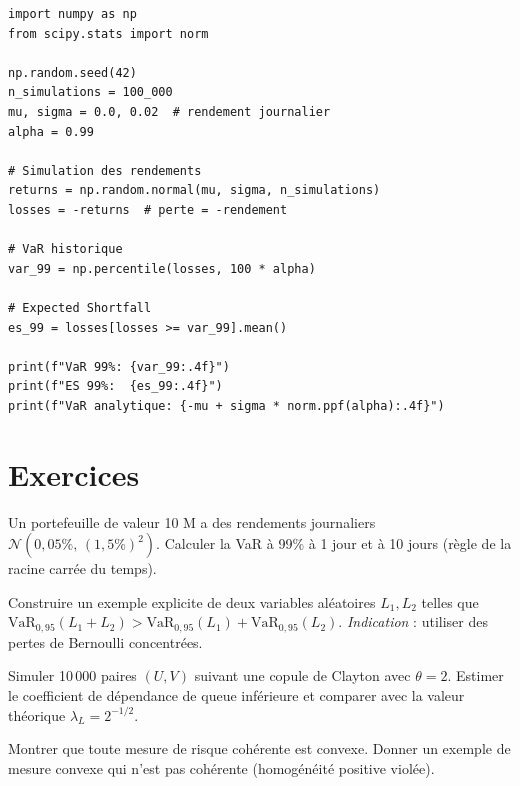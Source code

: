 \begin{codeblock}[title=\textbf{Calcul de la VaR et de l'ES par simulation Monte Carlo}]
\begin{verbatim}
import numpy as np
from scipy.stats import norm

np.random.seed(42)
n_simulations = 100_000
mu, sigma = 0.0, 0.02  # rendement journalier
alpha = 0.99

# Simulation des rendements
returns = np.random.normal(mu, sigma, n_simulations)
losses = -returns  # perte = -rendement

# VaR historique
var_99 = np.percentile(losses, 100 * alpha)

# Expected Shortfall
es_99 = losses[losses >= var_99].mean()

print(f"VaR 99%: {var_99:.4f}")
print(f"ES 99%:  {es_99:.4f}")
print(f"VaR analytique: {-mu + sigma * norm.ppf(alpha):.4f}")
\end{verbatim}
\end{codeblock}

\section{Exercices}

\begin{exercice}
Un portefeuille de valeur 10 M\texteuro{} a des rendements journaliers
$\mathcal{N}(0{,}05\%,\, (1{,}5\%)^2)$. Calculer la VaR \`a 99\% \`a 1 jour
et \`a 10 jours (r\`egle de la racine carr\'ee du temps).
\end{exercice}

\begin{exercice}
Construire un exemple explicite de deux variables al\'eatoires $L_1, L_2$
telles que $\mathrm{VaR}_{0{,}95}(L_1 + L_2) > \mathrm{VaR}_{0{,}95}(L_1) +
\mathrm{VaR}_{0{,}95}(L_2)$.
\textit{Indication} : utiliser des pertes de Bernoulli concentr\'ees.
\end{exercice}

\begin{exercice}
Simuler 10\,000 paires $(U, V)$ suivant une copule de Clayton avec
$\theta = 2$. Estimer le coefficient de d\'ependance de queue inf\'erieure
et comparer avec la valeur th\'eorique $\lambda_L = 2^{-1/2}$.
\end{exercice}

\begin{exercice}
Montrer que toute mesure de risque coh\'erente est convexe. Donner un exemple
de mesure convexe qui n'est pas coh\'erente (homog\'en\'eit\'e positive
viol\'ee).
\end{exercice}

